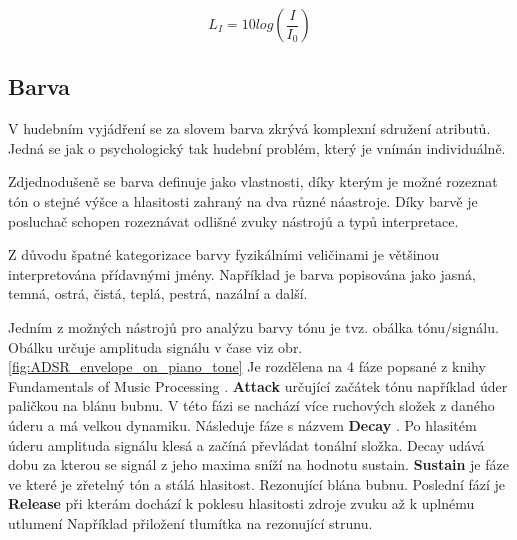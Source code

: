   \begin{equation}
    L_I = 10log(\frac{I}{I_0})
    \label{rov:hladina_intenzity}
  \end{equation}

  \subsection{Barva} \label{sec:Barva}

  V hudebním vyjádření se za slovem barva zkrývá komplexní sdružení atributů.
  Jedná se jak o psychologický tak hudební problém, který je vnímán individuálně\cite{The_perception_of_musical_timbre}.

  Zdjednodušeně se barva definuje jako vlastnosti, díky kterým je možné rozeznat tón o stejné výšce a hlasitosti zahraný na dva různé náastroje\cite{MULLER2014713}.
  Díky barvě je posluchač schopen rozeznávat odlišné zvuky nástrojů a typů interpretace.

  Z důvodu špatné kategorizace barvy fyzikálními veličinami je většinou interpretována přídavnými jmény.
  Například je barva popisována jako jasná, temná, ostrá, čistá, teplá, pestrá, nazální a další.

  Jedním z možných nástrojů pro analýzu barvy tónu je tvz. obálka tónu/signálu.
  Obálku určuje amplituda signálu v čase viz obr. \ref{fig:ADSR_envelope_on_piano_tone}
  Je rozdělena na 4 fáze popsané z knihy Fundamentals of Music Processing \cite{fundamental_of_music_processing}.
  \textbf{Attack } určující začátek tónu například úder paličkou na blánu bubnu.
  V této fázi se nachází více ruchových složek z daného úderu a má velkou dynamiku.
  Následuje fáze s názvem \textbf{Decay }.
  Po hlasitém úderu amplituda signálu klesá a začíná převládat tonální složka. Decay udává dobu za kterou se signál z jeho maxima sníží na hodnotu sustain.
  \textbf{Sustain } je fáze ve které je zřetelný tón a stálá hlasitost. Rezonující blána bubnu.
  Poslední fází je \textbf{Release } při kterám dochází k poklesu hlasitosti zdroje zvuku až k uplnému utlumení
  Například přiložení tlumítka na rezonující strunu.

